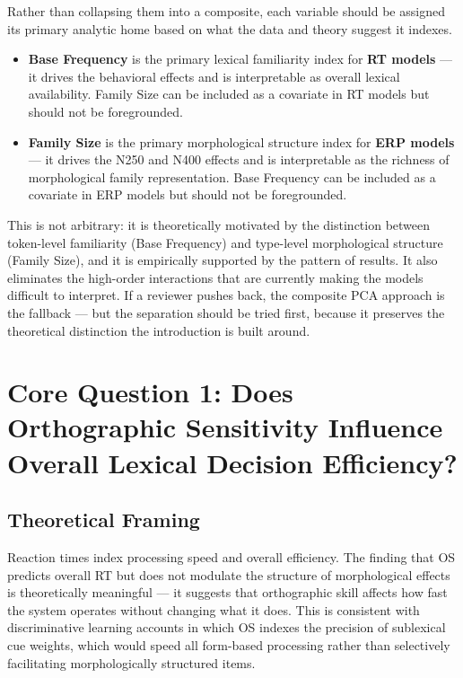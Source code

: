 \documentclass[12pt]{article}
\begin{document}
	Rather than collapsing them into a composite, each variable should be assigned its primary analytic home based on what the data and theory suggest it indexes.
	
	\begin{itemize}
		\item \textbf{Base Frequency} is the primary lexical familiarity index for \textbf{RT models} --- it drives the behavioral effects and is interpretable as overall lexical availability. Family Size can be included as a covariate in RT models but should not be foregrounded.
		\item \textbf{Family Size} is the primary morphological structure index for \textbf{ERP models} --- it drives the N250 and N400 effects and is interpretable as the richness of morphological family representation. Base Frequency can be included as a covariate in ERP models but should not be foregrounded.
	\end{itemize}
	
	This is not arbitrary: it is theoretically motivated by the distinction between token-level familiarity (Base Frequency) and type-level morphological structure (Family Size), and it is empirically supported by the pattern of results. It also eliminates the high-order interactions that are currently making the models difficult to interpret. If a reviewer pushes back, the composite PCA approach is the fallback --- but the separation should be tried first, because it preserves the theoretical distinction the introduction is built around.
	
	\section{Core Question 1: Does Orthographic Sensitivity Influence Overall Lexical Decision Efficiency?}
	
	\subsection{Theoretical Framing}
	
	Reaction times index processing speed and overall efficiency. The finding that OS predicts overall RT but does not modulate the structure of morphological effects is theoretically meaningful --- it suggests that orthographic skill affects how fast the system operates without changing what it does. This is consistent with discriminative learning accounts in which OS indexes the precision of sublexical cue weights, which would speed all form-based processing rather than selectively facilitating morphologically structured items.
	
\end{document}
